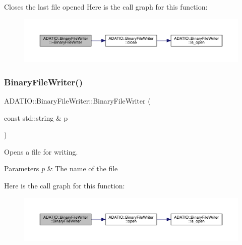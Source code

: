 Closes the last file opened Here is the call graph for this function\+:\nopagebreak
\begin{figure}[H]
\begin{center}
\leavevmode
\includegraphics[width=350pt]{dc/d11/classADATIO_1_1BinaryFileWriter_ae74f92826c49450ba710f22300718ada_cgraph}
\end{center}
\end{figure}
\mbox{\label{classADATIO_1_1BinaryFileWriter_a7ccd0f56a5d98e909770f3198f94e9d9}} 
\subsubsection{\texorpdfstring{BinaryFileWriter()}{BinaryFileWriter()}\hspace{0.1cm}{\footnotesize\ttfamily [2/6]}}
{\footnotesize\ttfamily A\+D\+A\+T\+I\+O\+::\+Binary\+File\+Writer\+::\+Binary\+File\+Writer (\begin{DoxyParamCaption}\item[{const std\+::string \&}]{p }\end{DoxyParamCaption})\hspace{0.3cm}{\ttfamily [explicit]}}

Opens a file for writing. 
\begin{DoxyParams}{Parameters}
{\em p} & The name of the file \\
\hline
\end{DoxyParams}
Here is the call graph for this function\+:\nopagebreak
\begin{figure}[H]
\begin{center}
\leavevmode
\includegraphics[width=350pt]{dc/d11/classADATIO_1_1BinaryFileWriter_a7ccd0f56a5d98e909770f3198f94e9d9_cgraph}
\end{center}
\end{figure}
\mbox{\label{classADATIO_1_1BinaryFileWriter_aa0579bad52db7809ed5d30b964aa3443}} 
